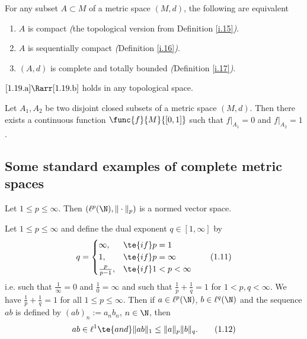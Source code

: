 \begin{thm}\label{i.19}
    For any subset $A\subset M$ of a metric space $(M,d)$, the following are equivalent
    \begin{enumerate}[label=\alph*)]
        \item $A$ is compact \emph{(}the topological version from Definition \ref{i.15}\emph{)}.\label{1.19.a}
        \item $A$ is sequentially compact \emph{(}Definition \ref{i.16}\emph{)}.\label{1.19.b}
        \item $(A,d)$ is complete and totally bounded \emph{(}Definition \ref{i.17}\emph{)}.\label{1.19.c}
    \end{enumerate}

    $\ref{1.19.a}\Rarr \ref{1.19.b}$ holds in any topological space.
\end{thm}

\begin{lem}[Urysohn]\label{i.20}
    Let $A_1,A_2$ be two disjoint closed subsets of a metric space $(M,d)$. 
    Then there exists a continuous function $\func{f}{M}{[0,1]}$ such that $f|_{A_1}=0$ and $f|_{A_2}=1$.
\end{lem}

\subsection{Some standard examples of complete metric spaces}

\begin{lem}\label{i.21}
    Let $1\leq p\leq\infty$. Then $(\ell^p(\N),\|\cdot\|_p)$ is a normed vector space.
\end{lem}

\begin{lem}\label{i.22}
    Let $1\leq p\leq\infty$ and define the dual exponent $q\in[1,\infty]$ by
    \[q=\begin{cases}\infty,&\te{if }p=1\\1,&\te{if }p=\infty\\\frac{p}{p-1},&\te{if }1<p<\infty\end{cases}\label{1.11}\tag{1.11}\]
    i.e. such that $\frac{1}{\infty}=0$ and $\frac{1}{0}=\infty$ and such that $\frac{1}{p}+\frac{1}{q}=1$ for $1<p,q<\infty$. We have $\frac{1}{p}+\frac{1}{q}=1$ for all $1\leq p\leq\infty$. Then if $a\in\ell^p(\N)$, $b\in\ell^q(\N)$ and the sequence $ab$ is defined by $(ab)_n:=a_nb_n$, $n\in\N$, then
    \[ab\in\ell^1\te{ and }\|ab\|_1\leq\|a\|_p\|b\|_q.\tag{1.12}\label{1.12}\]
\end{lem}

